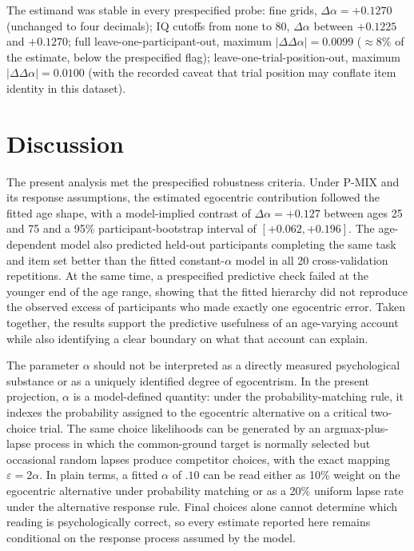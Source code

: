 \documentclass[11pt]{article}
\newcommand{\dalpha}{\ensuremath{\Delta\alpha}}
\begin{document}
The estimand was stable in every prespecified probe: fine grids,
$\dalpha = +0.1270$ (unchanged to four decimals); IQ cutoffs from none to 80,
\dalpha{} between $+0.1225$ and $+0.1270$; full leave-one-participant-out,
maximum $|\Delta\dalpha| = 0.0099$ ($\approx$8\% of the estimate, below the
prespecified flag); leave-one-trial-position-out, maximum
$|\Delta\dalpha| = 0.0100$ (with the recorded caveat that trial position may
conflate item identity in this dataset).

\section{Discussion}\label{sec:discussion}

The present analysis met the prespecified robustness criteria. Under P-MIX and
its response assumptions, the estimated egocentric contribution followed the
fitted age shape, with a model-implied contrast of $\dalpha = +0.127$ between
ages 25 and 75 and a 95\% participant-bootstrap interval of $[+0.062, +0.196]$.
The age-dependent model also predicted held-out participants completing the same
task and item set better than the fitted constant-$\alpha$ model in all 20
cross-validation repetitions. At the same time, a prespecified predictive check
failed at the younger end of the age range, showing that the fitted hierarchy
did not reproduce the observed excess of participants who made exactly one
egocentric error. Taken together, the results support the predictive usefulness
of an age-varying account while also identifying a clear boundary on what that
account can explain.

The parameter $\alpha$ should not be interpreted as a directly measured
psychological substance or as a uniquely identified degree of egocentrism. In
the present projection, $\alpha$ is a model-defined quantity: under the
probability-matching rule, it indexes the probability assigned to the egocentric
alternative on a critical two-choice trial. The same choice likelihoods can be
generated by an argmax-plus-lapse process in which the common-ground target is
normally selected but occasional random lapses produce competitor choices, with
the exact mapping $\varepsilon = 2\alpha$. In plain terms, a fitted $\alpha$ of
$.10$ can be read either as 10\% weight on the egocentric alternative under
probability matching or as a 20\% uniform lapse rate under the alternative
response rule. Final choices alone cannot determine which reading is
psychologically correct, so every estimate reported here remains conditional on
the response process assumed by the model.
\end{document}
